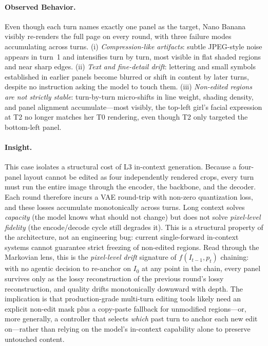 \paragraph{Observed Behavior.}
Even though each turn names exactly one panel as the target, Nano Banana visibly re-renders the full page on every round, with three failure modes accumulating across turns. (i) \emph{Compression-like artifacts}: subtle JPEG-style noise appears in turn~1 and intensifies turn by turn, most visible in flat shaded regions and near sharp edges. (ii) \emph{Text and fine-detail drift}: lettering and small symbols established in earlier panels become blurred or shift in content by later turns, despite no instruction asking the model to touch them. (iii) \emph{Non-edited regions are not strictly stable}: turn-by-turn micro-shifts in line weight, shading density, and panel alignment accumulate---most visibly, the top-left girl's facial expression at T2 no longer matches her T0 rendering, even though T2 only targeted the bottom-left panel.

\paragraph{Insight.}
This case isolates a structural cost of L3 in-context generation. Because a four-panel layout cannot be edited as four independently rendered crops, every turn must run the entire image through the encoder, the backbone, and the decoder. Each round therefore incurs a VAE round-trip with non-zero quantization loss, and these losses accumulate monotonically across turns. Long context solves \emph{capacity} (the model knows what should not change) but does not solve \emph{pixel-level fidelity} (the encode/decode cycle still degrades it). This is a structural property of the architecture, not an engineering bug: current single-forward in-context systems cannot guarantee strict freezing of non-edited regions. Read through the Markovian lens, this is the \emph{pixel-level drift} signature of $f(I_{t-1}, p_t)$ chaining: with no agentic decision to re-anchor on $I_0$ at any point in the chain, every panel survives only as the lossy reconstruction of the previous round's lossy reconstruction, and quality drifts monotonically downward with depth. The implication is that production-grade multi-turn editing tools likely need an explicit non-edit mask plus a copy-paste fallback for unmodified regions---or, more generally, a controller that selects \emph{which} past turn to anchor each new edit on---rather than relying on the model's in-context capability alone to preserve untouched content.



